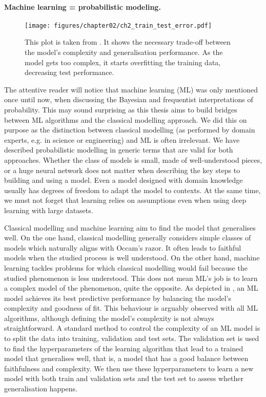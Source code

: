 \paragraph{Machine learning = probabilistic modeling.}
\begin{figure}
  \centering
  \texttt{[image: figures/chapter02/ch2\_train\_test\_error.pdf]}
  \caption{This plot is taken from \citet{louppe2014understanding}. It shows the necessary trade-off between the model's complexity and generalisation performance. As the model gets too complex, it starts overfitting the training data, decreasing test performance.}
  \label{fig:ch02:learning_curves}
\end{figure}
The attentive reader will notice that machine learning (ML) was only mentioned once until now, when discussing the Bayesian and frequentist interpretations of probability.
This may sound surprising as this thesis aims to build bridges between ML algorithms and the classical modelling approach. We did this on purpose as the distinction between classical modelling (as performed by domain experts, e.g. in science or engineering) and ML is often irrelevant. We have described probabilistic modelling in generic terms that are valid for both approaches. Whether the class of models is small, made of well-understood pieces, or a huge neural network does not matter when describing the key steps to building and using a model. Even a model designed with domain knowledge usually has degrees of freedom to adapt the model to contexts. At the same time, we must not forget that learning relies on assumptions even when using deep learning with large datasets.

Classical modelling and machine learning aim to find the model that generalises well.
On the one hand, classical modelling generally considers simple classes of models which naturally aligns with Occam's razor. It often leads to faithful models when the studied process is well understood. On the other hand, machine learning tackles problems for which classical modelling would fail because the studied phenomenon is less understood. This does not mean ML's job is to learn a complex model of the phenomenon, quite the opposite. As depicted in , an ML model achieves its best predictive performance by balancing the model's complexity and goodness of fit. This behaviour is arguably observed with all ML algorithms, although defining the model's complexity is not always straightforward. A standard method to control the complexity of an ML model is to split the data into training, validation and test sets. The validation set is used to find the hyperparameters of the learning algorithm that lead to a trained model that generalises well, that is, a model that has a good balance between faithfulness and complexity. We then use these hyperparameters to learn a new model with both train and validation sets and the test set to assess whether generalisation happens.

